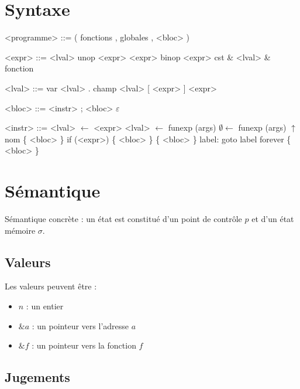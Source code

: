 \documentclass{article}
\begin{document}
\section{Syntaxe}

\begin{minipage}{0.6\textwidth}
\begin{grammar}
<programme> ::= ( fonctions , globales , <bloc> )

    <expr> ::= <lval>
          \alt unop <expr>
          \alt <expr> binop <expr>
          \alt cst
          \alt \& <lval>
          \alt \& fonction

    <lval> ::= var
          \alt <lval> . champ
          \alt <lval> [ <expr> ]
          \alt * <expr>
\end{grammar}
\end{minipage}
\begin{minipage}{0.4\textwidth}
\begin{grammar}
     <bloc> ::= <instr> ; <bloc>
           \alt $ε$

    <instr> ::= <lval> $←$ <expr>
           \alt <lval> $←$ funexp (args)
           \alt  $∅ ←$ funexp (args)
           \alt $↑$ nom \{ <bloc> \}
           \alt if (<expr>) \{ <bloc> \}
           \alt \{ <bloc> \} label:
           \alt goto label
           \alt forever \{ <bloc> \}

\end{grammar}
\end{minipage}

\section{Sémantique}

Sémantique concrète : un état est constitué d'un point de contrôle $p$ et d'un
état mémoire $σ$.

\subsection{Valeurs}

Les valeurs peuvent être :

\begin{itemize}
\item $n$ : un entier
\item $\&a$ : un pointeur vers l'adresse $a$
\item $\&f$ : un pointeur vers la fonction $f$
\end{itemize}

\subsection{Jugements}
\end{document}
